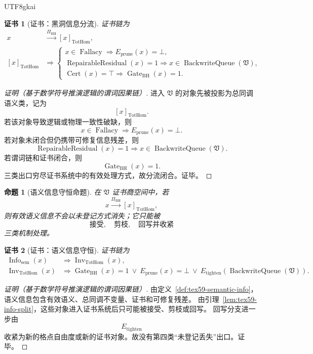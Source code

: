 \documentclass[12pt]{article}
\newtheorem{proposition}{命题}[section]
\newtheorem{Certificate}{证书}[section]
\newcommand{\Vsys}{\mathfrak V}
\DeclareMathOperator{\Cert}{Cert}
\DeclareMathOperator{\Fallacy}{Fallacy}
\DeclareMathOperator{\Gate}{Gate}
\DeclareMathOperator{\Inv}{Inv}
\DeclareMathOperator{\BackwriteQueue}{BackwriteQueue}
\DeclareMathOperator{\TotHom}{TotHom}
\DeclareMathOperator{\RepairableResidual}{RepairableResidual}
\DeclareMathOperator{\Info}{Info}
\begin{document}
\begin{CJK*}{UTF8}{gkai}
\begin{Certificate}[证书：黑洞信息分流]
\label{cert:tex59-info-split}
证书链为
\[
  \begin{aligned}
  x
  &\xrightarrow{\Pi_{\mathrm{BH}}}
  [x]_{\TotHom},\\
  [x]_{\TotHom}
  &\Longrightarrow
  \begin{cases}
  x\in\Fallacy\Rightarrow E_{\mathrm{prune}}(x)=\bot,\\
  \RepairableResidual(x)=1\Rightarrow x\in\BackwriteQueue(\Vsys),\\
  \Cert(x)=\top\Rightarrow \Gate_{\mathrm{BH}}(x)=1.
  \end{cases}
  \end{aligned}
\]
\end{Certificate}

\begin{proof}[证明（基于数学符号推演逻辑的谓词因果链）]
进入 \(\Vsys\) 的对象先被投影为总同调语义类，记为
\[
  [x]_{\TotHom}.
\]
若该对象导致逻辑或物理一致性破缺，则
\[
  x\in\Fallacy
  \Rightarrow
  E_{\mathrm{prune}}(x)=\bot.
\]
若对象未闭合但仍携带可修复信息残差，则
\[
  \RepairableResidual(x)=1
  \Rightarrow
  x\in\BackwriteQueue(\Vsys).
\]
若谓词链和证书闭合，则
\[
  \Gate_{\mathrm{BH}}(x)=1.
\]
三类出口穷尽证书系统中的有效处理方式，故分流闭合。证毕。
\end{proof}

\begin{proposition}[语义信息守恒命题]
\label{prop:tex59-semantic-info-conservation}
在 \(\Vsys\) 证书商空间中，若
\[
  x
  \xrightarrow{\Pi_{\mathrm{BH}}}
  [x]_{\TotHom},
\]
则有效语义信息不会以未登记方式消失；它只能被
\[
  \text{接受},\quad \text{剪枝},\quad \text{回写并收紧}
\]
三类机制处理。
\end{proposition}

\begin{Certificate}[证书：语义信息守恒]
\label{cert:tex59-semantic-info-conservation}
证书链为
\[
  \begin{aligned}
  \Info_{\mathrm{sem}}(x)
  &\Longrightarrow
  \Inv_{\TotHom}(x),\\
  \Inv_{\TotHom}(x)
  &\Longrightarrow
  \Gate_{\mathrm{BH}}(x)=1\
  \vee\
  E_{\mathrm{prune}}(x)=\bot\
  \vee\
  E_{\mathrm{tighten}}(\BackwriteQueue(\Vsys)).
  \end{aligned}
\]
\end{Certificate}

\begin{proof}[证明（基于数学符号推演逻辑的谓词因果链）]
由定义~\ref{def:tex59-semantic-info}，语义信息包含有效语义、总同调不变量、证书和可修复残差。
由引理~\ref{lem:tex59-info-split}，这些对象进入证书系统后只可能被接受、剪枝或回写。
回写分支进一步由
\[
  E_{\mathrm{tighten}}
\]
收紧为新的格点自由度或新的证书对象。故没有第四类“未登记丢失”出口。证毕。
\end{proof}


\end{CJK*}
\end{document}

